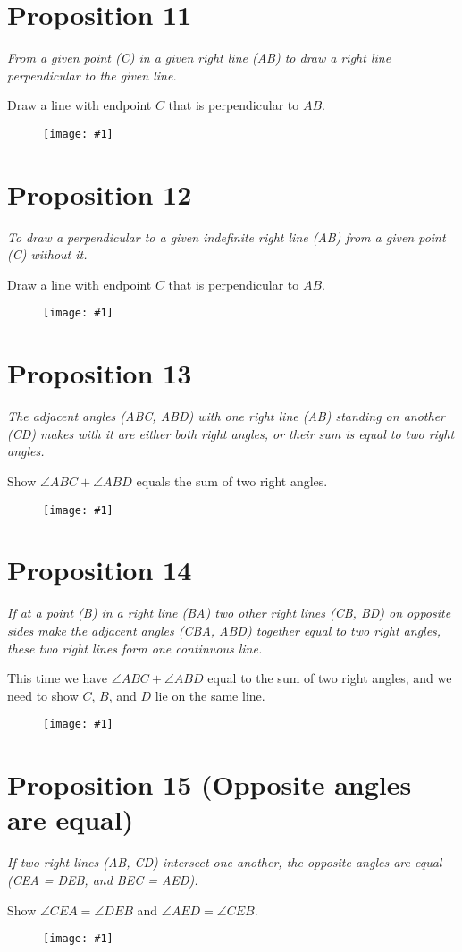 \documentclass[openany]{book}
\newcommand{\diagram}[1]{
    \vspace*{\fill}
    \begin{figure}[H]
        \centering
        \texttt{[image: \#1]}
    \end{figure}
    \vspace*{\fill}
}
\newenvironment{proposition}
    {\begin{center}\em}
    {\end{center}}
\begin{document}
    \section{Proposition 11}
    \begin{proposition}
    From a given point (C) in a given right line (AB) to draw a right line perpendicular to the given line.
    \end{proposition}
    Draw a line with endpoint $C$ that is perpendicular to $AB$.
    \diagram{prop11.pdf}


    \clearpage
    \section{Proposition 12}
    \begin{proposition}
    To draw a perpendicular to a given indefinite right line (AB) from a given point (C) without it.
    \end{proposition}
    Draw a line with endpoint $C$ that is perpendicular to $AB$.
    \diagram{prop12.pdf}


    \clearpage
    \section{Proposition 13}
    \begin{proposition}
    The adjacent angles (ABC, ABD) with one right line (AB) standing on another (CD) makes with it are either both right angles, or their sum is equal to two right angles.
    \end{proposition}
    Show $\angle{ABC} + \angle{ABD}$ equals the sum of two right angles.
    \diagram{prop13.pdf}


    \clearpage
    \section{Proposition 14}
    \begin{proposition}
    If at a point (B) in a right line (BA) two other right lines (CB, BD) on opposite sides make the adjacent angles (CBA, ABD) together equal to two right angles, these two right lines form one continuous line.
    \end{proposition}
    This time we have $\angle{ABC} + \angle{ABD}$ equal to the sum of two right angles, and we need to show $C$, $B$, and $D$ lie on the same line.
    \diagram{prop14.pdf}


    \clearpage
    \section{Proposition 15 (Opposite angles are equal)}
    \begin{proposition}
    If two right lines (AB, CD) intersect one another, the opposite angles are equal (CEA = DEB, and BEC = AED).
    \end{proposition}
    Show $\angle{CEA} = \angle{DEB}$ and $\angle{AED} = \angle{CEB}$.
    \diagram{prop15.pdf}
\end{document}
